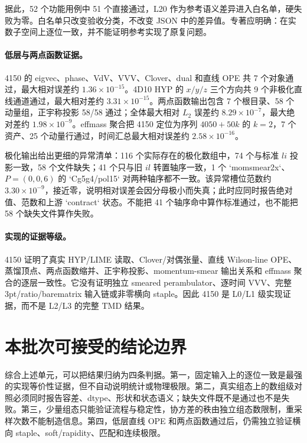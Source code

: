 据此，52 个功能用例中 51 个直接通过，L20 作为参考语义差异进入白名单，硬失败为零。白名单只改变验收分类，不改变 JSON 中的差异值。专著应明确：在实数子空间上逐位一致，并不能证明参考实现了原复问题。

\paragraph{低层与两点函数证据。}
4150 的 eigvec、phase、VdV、VVV、Clover、dual 和直线 OPE 共 7 个对象通过，最大相对误差约 \(1.36\times10^{-15}\)。4D10 HYP 的 \(x/y/z\) 三个方向共 9 个非极化直线通道通过，最大相对差约 \(3.31\times10^{-15}\)。两点函数输出包含 7 个根目录、58 个动量组，正宇称投影 58/58 通过；全体最大相对 \(L_2\) 误差约 \(8.29\times10^{-7}\)，最大绝对差约 \(1.98\times10^{-9}\)。effmass 聚合把 4150 定位为序列 \(4050+50k\) 的 \(k=2\)，7 个资产、25 个动量行通过，时间汇总最大相对误差约 \(2.58\times10^{-16}\)。

极化输出给出更细的异常清单：116 个实际存在的极化数组中，74 个与标准 \(li\) 投影一致，58 个文件缺失；41 个只与旧 \(il\) 转置轴序一致，1 个 `momsmear2x`、\(P=(0,0,6)\) 的 `Cg5g4/pol15` 对两种轴序都不一致。该异常槽位范数约 \(3.30\times10^{-9}\)，接近零，说明相对误差会因分母极小而失真；此时应同时报告绝对值、范数和上游 `contract` 状态。不能把 41 个轴序命中算作标准通过，也不能把 58 个缺失文件算作失败。

\paragraph{实现的证据等级。}
4150 证明了真实 HYP/LIME 读取、Clover/对偶张量、直线 Wilson-line OPE、蒸馏顶点、两点函数缩并、正宇称投影、momentum-smear 输出关系和 effmass 聚合的逐层一致性。它没有证明独立 smeared perambulator、逐时间 VVV、完整 3pt/ratio/barematrix 输入链或非零横向 staple。因此 4150 是 L0/L1 级实现证据，而不是 L2/L3 的完整 TMD 结果。

\section{本批次可接受的结论边界}

综合上述单元，可以把结果归纳为四条判据。第一，固定输入上的逐位一致是最强的实现等价性证据，但不自动说明统计或物理极限。第二，真实组态上的数组级对照必须同时报告容差、dtype、形状和状态语义；缺失文件既不是通过也不是失败。第三，少量组态只能验证流程与稳定性，协方差的秩由独立组态数限制，重采样次数不能制造信息。第四，低层直线 OPE 和两点函数通过后，仍需独立验证横向 staple、soft/rapidity、匹配和连续极限。

